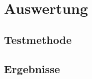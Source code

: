 %
\chapter{Auswertung}
\label{sec:evaluation}

\section{Testmethode}
\label{sec:evaluation:methodology}

\section{Ergebnisse}
\label{sec:evaluation:results}
